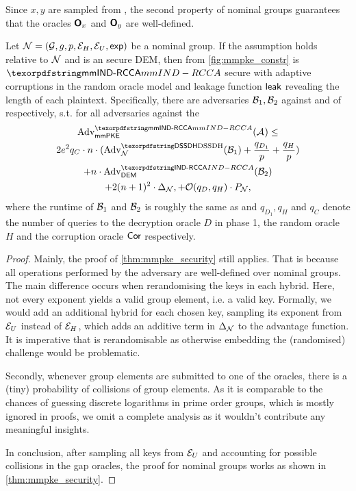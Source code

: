 \begin{remark}
  Since $x,y$ are sampled from \nGU, the second property of nominal groups guarantees that the oracles $\oracle{O}_x$
  and $\oracle{O}_y$ are well-defined.
\end{remark}

\begin{theorem}
  Let $\ngroup = (\nG, g, p, \nGE, \nGU, \nGexp)$ be a nominal group.
  If the \sdh assumption holds relative to  $\ngroup$ and \dem is an \indrcca secure DEM, then \mmPKE from
  \cref{fig:mmpke_constr} is $\mmindrcca$ secure with adaptive corruptions in the random oracle model and leakage
  function $\leak$ revealing the length of each plaintext. Specifically, there are adversaries $\Bdv[1],\Bdv[2]$ against
  \sdh and \indrcca of \dem respectively, s.t. for all adversaries \Adv against the \mmindrcca
  \begin{multline*}
    \adv{\mmindrcca}{\mmPKE}({\Adv}) \leq \\2e^2q_C\cdot n\cdot(\adv{\sdh}{\ngroup}({\Bdv[1]}) +
                                       \frac{q_{D_1}}{p} + \frac{q_{H}}{p}) \\ + n \cdot \adv{\indrcca}{\dem}({\Bdv[2]}) 
    \\+ 2(n+1)^2\cdot\Delta_{\ngroup}, + \mathcal{O}(q_D, q_H)\cdot P_{\ngroup},
  \end{multline*}
  where the runtime of $\Bdv[1]$ and $\Bdv[2]$ is roughly the same as \Adv and $q_{D_1},q_H$ and $q_C$ denote the number of queries to the decryption oracle $D$ in phase 1, the random oracle
  $H$ and the corruption oracle $\term{Cor}$ respectively.
\end{theorem}

\begin{proof}
  Mainly, the proof of \cref{thm:mmpke_security} still applies. That is because all operations performed by the
  adversary are well-defined over nominal groups. The main difference occurs when rerandomising the keys in each 
  hybrid. Here, not every exponent yields a valid group element, i.e. a valid key. Formally, we would add an additional
  hybrid for each chosen key, sampling its exponent from $\nGU$ instead of $\nGE$, which adds an additive term in $\Delta_{\ngroup}$ to
  the advantage function. It is imperative that \ngroup is rerandomisable as otherwise embedding the (randomised)
  challenge would be problematic.
  
  Secondly, whenever group elements are submitted to one of the oracles, there is a (tiny) probability of collisions of
  group elements. As it is comparable to the chances of guessing discrete logarithms in prime order groups, which is
  mostly ignored in proofs, we omit a complete analysis as it wouldn't contribute any meaningful insights.

  In conclusion, after sampling all keys from $\nGU$ and accounting for possible collisions in the gap oracles, the
  proof for nominal groups works as shown in \cref{thm:mmpke_security}.
\end{proof}

